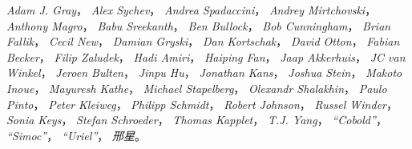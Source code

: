 \emph{Adam J. Gray}，
\emph{Alex Sychev}，
\emph{Andrea Spadaccini}，
\emph{Andrey Mirtchovski}，
\emph{Anthony Magro}，
\emph{Babu Sreekanth}，
\emph{Ben Bullock}，
\emph{Bob Cunningham}，
\emph{Brian Fallik}，
\emph{Cecil New}，
\emph{Damian Gryski}，
\emph{Dan Kortschak}，
\emph{David Otton}，
\emph{Fabian Becker}，
\emph{Filip Zaludek}，
\emph{Hadi Amiri}，
\emph{Haiping Fan}，
\emph{Jaap Akkerhuis}，
\emph{JC van Winkel}，
\emph{Jeroen Bulten}，
\emph{Jinpu Hu}，
\emph{Jonathan Kans}，
\emph{Joshua Stein}，
\emph{Makoto Inoue}，
\emph{Mayuresh Kathe}，
\emph{Michael Stapelberg}，
\emph{Olexandr Shalakhin}，
\emph{Paulo Pinto}，
\emph{Peter Kleiweg}，
\emph{Philipp Schmidt}，
\emph{Robert Johnson}，
\emph{Russel Winder}，
\emph{Sonia Keys}，
\emph{Stefan Schroeder}，
\emph{Thomas Kapplet}，
\emph{T.J. Yang}，
\emph{``Cobold''}，
\emph{``Simoc''}，
\emph{``Uriel''}，
\emph{邢星}。

